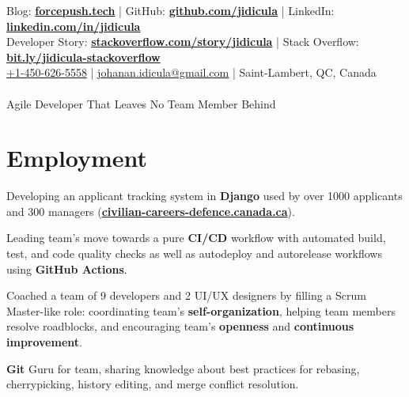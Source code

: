 \documentclass[]{jidicula-resume}
\begin{document}
\livelocation\hfill\lastupdated

{ Blog: \href{http://bit.ly/jidicula-site}{\bf forcepush.tech}
  | GitHub: \href{http://bit.ly/jidicula_github}{\bf github.com/jidicula} | LinkedIn: \href{https://bit.ly/jidicula-linkedin}{\bf linkedin.com/in/jidicula} \\
  Developer Story: \href{https://stackoverflow.com/story/jidicula}{\bf stackoverflow.com/story/jidicula} | Stack Overflow: \href{https://bit.ly/jidicula-stackoverflow}{\bf bit.ly/jidicula-stackoverflow} \\
  \href{tel:14506265558}{+1-450-626-5558}
  | \href{mailto:johanan.idicula+resume@gmail.com}{johanan.idicula@gmail.com}
  | Saint-Lambert, QC, Canada \\~\\
{\Large Agile Developer That Leaves No Team Member Behind}
}

\section{Employment}

\vspace{\topsep} %
\begin{tightemize}
\item Developing an applicant tracking system in \textbf{Django} used by over 1000 applicants and 300 managers (\href{https://civilian-careers-defence.canada.ca}{\bf civilian-careers-defence.canada.ca}).
\item Leading team's move towards a pure \textbf{CI/CD} workflow with automated build, test, and code quality checks as well as autodeploy and autorelease workflows using \textbf{GitHub Actions}.
\item Coached a team of 9 developers and 2 UI/UX designers by filling a Scrum Master-like role: coordinating team's \textbf{self-organization}, helping team members resolve roadblocks, and encouraging team's \textbf{openness} and \textbf{continuous improvement}.
\item \textbf{Git} Guru for team, sharing knowledge about best practices for rebasing, cherrypicking, history editing, and merge conflict resolution.
\end{tightemize}
\sectionsep{}
\end{document}
